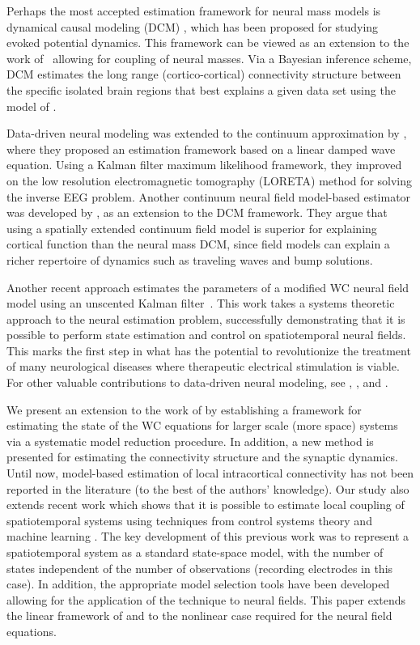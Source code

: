 \documentclass[review,authoryear,3p]{elsarticle}
\begin{document}
Perhaps the most accepted estimation framework for neural mass models is dynamical causal modeling (DCM) \citep{David2003,David2006}, which has been proposed for studying evoked potential dynamics. This framework can be viewed as an extension to the work of~\citet{Valdes1999} allowing for coupling of neural masses. Via a Bayesian inference scheme, DCM estimates the long range (cortico-cortical) connectivity structure between the specific isolated brain regions that best explains a given data set using the model of \citet{Jansen1995}.

Data-driven neural modeling was extended to the continuum approximation by \citet{Galka2008}, where they proposed an estimation framework based on a linear damped wave equation. Using a Kalman filter maximum likelihood framework, they improved on the low resolution electromagnetic tomography (LORETA) method for solving the inverse EEG problem. Another continuum neural field model-based estimator was developed by \citet{Daunizeau2009}, as an extension to the DCM framework. They argue that using a spatially extended continuum field model is superior for explaining cortical function than the neural mass DCM, since field models can explain a richer repertoire of dynamics such as traveling waves and bump solutions.   

Another recent approach estimates the parameters of a modified WC neural field model using an unscented Kalman filter~\citep{schiff2008kalman}. This work takes a systems theoretic approach to the neural estimation problem, successfully demonstrating that it is possible to perform state estimation and control on spatiotemporal neural fields. This marks the first step in what has the potential to revolutionize the treatment of many neurological diseases where therapeutic electrical stimulation is viable. For other valuable contributions to data-driven neural modeling, see \citet{Nunez2000}, \citet{Jirsa2002}, and \citet{Robinson2004}.

We present an extension to the work of \citet{schiff2008kalman} by establishing a framework for estimating the state of the WC equations for larger scale (more space) systems via a systematic model reduction procedure. In addition, a new method is presented for estimating the connectivity structure and the synaptic dynamics. Until now, model-based estimation of local intracortical connectivity has not been reported in the literature (to the best of the authors' knowledge). Our study also extends recent work which shows that it is possible to estimate local coupling of spatiotemporal systems using techniques from control systems theory and machine learning \citep{Dewar2009}. The key development of this previous work was to represent a spatiotemporal system as a standard state-space model, with the number of states independent of the number of observations (recording electrodes in this case). In addition, the appropriate model selection tools have been developed \citep{Scerri2009} allowing for the application of the technique to neural fields. This paper extends the linear framework of \citet{Dewar2009} and \citet{Scerri2009} to the nonlinear case required for the neural field equations. 
\end{document}
